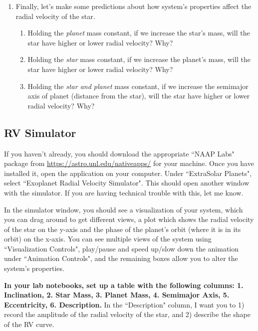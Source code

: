 \documentclass[11pt]{article}
\begin{document}
\begin{enumerate}
    \item Finally, let's make some predictions about how system's properties affect the radial velocity of the star.
    \begin{enumerate}
        \item Holding the \textit{planet} mass constant, if we increase the star's mass, will the star have higher or lower radial velocity? Why?
        \item Holding the \textit{star} mass constant, if we increase the planet's mass, will the star have higher or lower radial velocity? Why?
        \item Holding the \textit{star and planet} mass constant, if we increase the semimajor axis of planet (distance from the star), will the star have higher or lower radial velocity? Why?
    \end{enumerate}
        
\end{enumerate}

\subsection{RV Simulator}
\noindent
If you haven't already, you should download the appropriate ``NAAP Labs" package from \url{https://astro.unl.edu/nativeapps/} for your machine.  Once you have installed it, open the application on your computer.  Under ``ExtraSolar Planets", select ``Exoplanet Radial Velocity Simulator".  This should open another window with the simulator.  If you are having technical trouble with this, let me know.

\medskip \noindent
In the simulator window, you should see a visualization of your system, which you can drag around to get different views, a plot which shows the radial velocity of the star on the y-axis and the phase of the planet's orbit (where it is in its orbit) on the x-axis.  You can see multiple views of the system using ``Visualization Controls", play/pause and speed up/slow down the animation under ``Animation Controls", and the remaining boxes allow you to alter the system's properties.

\medskip \noindent
\textbf{In your lab notebooks, set up a table with the following columns: 1. Inclination, 2. Star Mass, 3. Planet Mass, 4. Semimajor Axis, 5. Eccentricity, 6. Description.}  In the ``Description" column, I want you to 1) record the amplitude of the radial velocity of the star, and 2) describe the shape of the RV curve.
\end{document}
